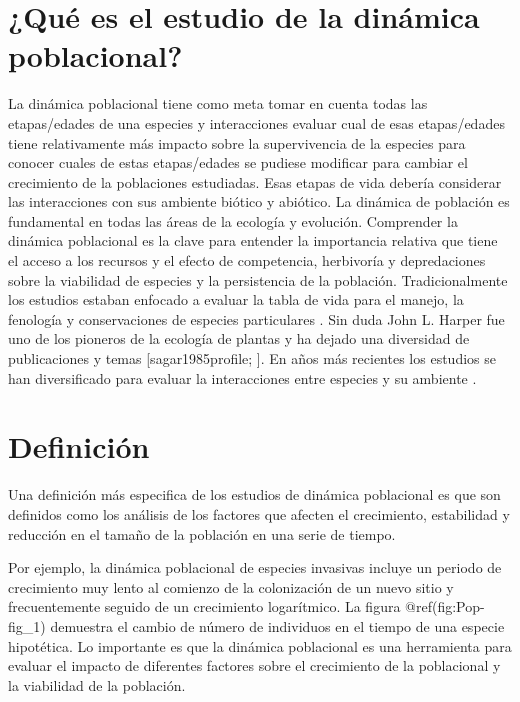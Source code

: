 \documentclass[
]{book}
\theoremstyle{definition}
\theoremstyle{definition}
\theoremstyle{definition}
\theoremstyle{definition}
\theoremstyle{remark}
\begin{document}
\section{¿Qué es el estudio de la dinámica poblacional?}\label{quuxe9-es-el-estudio-de-la-dinuxe1mica-poblacional}

La dinámica poblacional tiene como meta tomar en cuenta todas las etapas/edades de una especies y interacciones evaluar cual de esas etapas/edades tiene relativamente más impacto sobre la supervivencia de la especies para conocer cuales de estas etapas/edades se pudiese modificar para cambiar el crecimiento de la poblaciones estudiadas. Esas etapas de vida debería considerar las interacciones con sus ambiente biótico y abiótico. La dinámica de población es fundamental en todas las áreas de la ecología y evolución. Comprender la dinámica poblacional es la clave para entender la importancia relativa que tiene el acceso a los recursos y el efecto de competencia, herbivoría y depredaciones sobre la viabilidad de especies y la persistencia de la población. Tradicionalmente los estudios estaban enfocado a evaluar la tabla de vida para el manejo, la fenología y conservaciones de especies particulares \citep{harper1977population}. Sin duda John L. Harper fue uno de los pioneros de la ecología de plantas y ha dejado una diversidad de publicaciones y temas {[}sagar1985profile; \citet{sagar1985profile}{]}. En años más recientes los estudios se han diversificado para evaluar la interacciones entre especies y su ambiente \citep{caswell2000matrix, bacaer2011short} .

\section{Definición}\label{definiciuxf3n}

Una definición más especifica de los estudios de dinámica poblacional es que son definidos como los análisis de los factores que afecten el crecimiento, estabilidad y reducción en el tamaño de la población en una serie de tiempo.

Por ejemplo, la dinámica poblacional de especies invasivas incluye un periodo de crecimiento muy lento al comienzo de la colonización de un nuevo sitio y frecuentemente seguido de un crecimiento logarítmico. La figura @ref(fig:Pop-fig\_1) demuestra el cambio de número de individuos en el tiempo de una especie hipotética. Lo importante es que la dinámica poblacional es una herramienta para evaluar el impacto de diferentes factores sobre el crecimiento de la poblacional y la viabilidad de la población.
\end{document}
